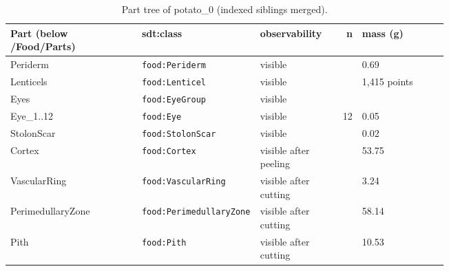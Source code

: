 \documentclass[10.5pt,a4paper]{article}
\begin{document}
\begin{table}[htbp]\centering\scriptsize\caption{Part tree of potato\_0 (indexed siblings merged).}
\begin{tabularx}{\linewidth}{@{}p{0.30\linewidth}p{0.27\linewidth}p{0.17\linewidth}rX@{}}\toprule Part (below /Food/Parts) & sdt:class & observability & n & mass (g) \\\midrule
\hspace*{0.0em}Periderm & \texttt{food:Periderm} & visible &  & 0.69 \\
\hspace*{0.9em}Lenticels & \texttt{food:Lenticel} & visible &  & 1,415 points \\
\hspace*{0.0em}Eyes & \texttt{food:EyeGroup} & visible &  &  \\
\hspace*{0.9em}Eye\_1..12 & \texttt{food:Eye} & visible & 12 & 0.05 \\
\hspace*{0.0em}StolonScar & \texttt{food:StolonScar} & visible &  & 0.02 \\
\hspace*{0.0em}Cortex & \texttt{food:Cortex} & visible after peeling &  & 53.75 \\
\hspace*{0.0em}VascularRing & \texttt{food:VascularRing} & visible after cutting &  & 3.24 \\
\hspace*{0.0em}PerimedullaryZone & \texttt{food:PerimedullaryZone} & visible after cutting &  & 58.14 \\
\hspace*{0.0em}Pith & \texttt{food:Pith} & visible after cutting &  & 10.53 \\\bottomrule\end{tabularx}\end{table}
\end{document}
